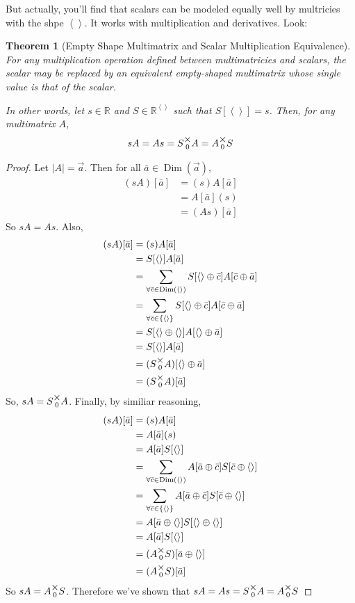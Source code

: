 \documentclass[12pt]{book}
\theoremstyle{definition}
\theoremstyle{plain}
\newtheorem{theorem}{Theorem}[chapter]
\theoremstyle{ppart}
\theoremstyle{case}
\theoremstyle{solution}
\DeclareMathOperator{\Dim}{Dim}
\newcommand{\mmult}[1]{\text{\raisebox{1ex}{$\underset{#1}{\times}$}}}
\begin{document}
But actually, you'll find that scalars can be modeled equally well by multricies
with the shpe $\left<\right>$. It works with multiplication and derivatives. Look:

\begin{theorem}[Empty Shape Multimatrix and Scalar Multiplication Equivalence]
\label{s_mm_mult_equiv}
For any multiplication operation defined between multimatricies and scalars,
the scalar may be replaced by an equivalent empty-shaped multimatrix whose
single value is that of the scalar.

In other words, let $s \in \mathbb{R}$ and $S \in \mathbb{R}^{\left<\right>}$ such that
$S[\left<\right>] = s$. Then, for any multimatrix $A$, 
\[ sA = As = S \mmult{0} A = A \mmult{0} S \]
\end{theorem}
\begin{proof}
Let $|A| = \vec{a}$. Then for all $\bar{a} \in \Dim(\vec{a})$,
\begin{align*}
	(sA)[\bar{a}]
	&= (s)A[\bar{a}] \\
	&= A[\bar{a}](s) \\
	&= (As)[\bar{a}]
\end{align*}
So $sA = As$. Also,
\begin{align*}
	(sA)[\bar{a}]
	&= (s)A[\bar{a}] \\
	&= S[\left<\right>]A[\bar{a}] \\
	&= \sum_{\forall \bar{c} \in \Dim(\left<\right>)}
		S[\left<\right> \oplus \bar{c}]A[\bar{c} \oplus \bar{a}] \\
	&= \sum_{\forall \bar{c} \in \{\left<\right>\}}
		S[\left<\right> \oplus \bar{c}]A[\bar{c} \oplus \bar{a}] \\
	&= S[\left<\right> \oplus \left<\right>]A[\left<\right> \oplus \bar{a}] \\
	&= S[\left<\right>]A[\bar{a}] \\
	&= (S \mmult{0} A)[\left<\right> \oplus \bar{a}] \\
	&= (S \mmult{0} A)[\bar{a}] \\
\end{align*}
So, $sA = S \mmult{0} A$.
Finally, by similiar reasoning,
\begin{align*}
	(sA)[\bar{a}]
	&= (s)A[\bar{a}] \\
	&= A[\bar{a}](s) \\
	&= A[\bar{a}]S[\left<\right>] \\
	&= \sum_{\forall \bar{c} \in \Dim(\left<\right>)}
		A[\bar{a} \oplus \bar{c}] S[\bar{c} \oplus \left<\right>] \\
	&= \sum_{\forall \bar{c} \in \{\left<\right>\}}
		A[\bar{a} \oplus \bar{c}] S[\bar{c} \oplus \left<\right>] \\
	&= A[\bar{a} \oplus \left<\right>] S[\left<\right> \oplus \left<\right>] \\
	&= A[\bar{a}]S[\left<\right>] \\
	&= (A \mmult{0} S)[\bar{a} \oplus \left<\right>] \\
	&= (A \mmult{0} S)[\bar{a}]
\end{align*}
So $sA = A \mmult{0} S$. Therefore we've shown that
$sA = As = S \mmult{0} A = A \mmult{0} S$
\end{proof}
\end{document}
